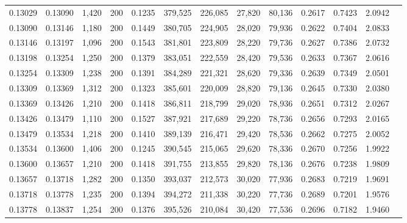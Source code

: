 \begin{tabular}{rrrrrrrrrrrrr}
0.13029 & 0.13090 &  1,420 & 200 &                                     0.1235 & 379,525 & 226,085 &  27,820 &  80,136 & 0.2617 & 0.7423 & 2.0942 \\
0.13090 & 0.13146 &  1,180 & 200 &                                     0.1449 & 380,705 & 224,905 &  28,020 &  79,936 & 0.2622 & 0.7404 & 2.0833 \\
0.13146 & 0.13197 &  1,096 & 200 &                                     0.1543 & 381,801 & 223,809 &  28,220 &  79,736 & 0.2627 & 0.7386 & 2.0732 \\
0.13198 & 0.13254 &  1,250 & 200 &                                     0.1379 & 383,051 & 222,559 &  28,420 &  79,536 & 0.2633 & 0.7367 & 2.0616 \\
0.13254 & 0.13309 &  1,238 & 200 &                                     0.1391 & 384,289 & 221,321 &  28,620 &  79,336 & 0.2639 & 0.7349 & 2.0501 \\
0.13309 & 0.13369 &  1,312 & 200 &                                     0.1323 & 385,601 & 220,009 &  28,820 &  79,136 & 0.2645 & 0.7330 & 2.0380 \\
0.13369 & 0.13426 &  1,210 & 200 &                                     0.1418 & 386,811 & 218,799 &  29,020 &  78,936 & 0.2651 & 0.7312 & 2.0267 \\
0.13426 & 0.13479 &  1,110 & 200 &                                     0.1527 & 387,921 & 217,689 &  29,220 &  78,736 & 0.2656 & 0.7293 & 2.0165 \\
0.13479 & 0.13534 &  1,218 & 200 &                                     0.1410 & 389,139 & 216,471 &  29,420 &  78,536 & 0.2662 & 0.7275 & 2.0052 \\
0.13534 & 0.13600 &  1,406 & 200 &                                     0.1245 & 390,545 & 215,065 &  29,620 &  78,336 & 0.2670 & 0.7256 & 1.9922 \\
0.13600 & 0.13657 &  1,210 & 200 &                                     0.1418 & 391,755 & 213,855 &  29,820 &  78,136 & 0.2676 & 0.7238 & 1.9809 \\
0.13657 & 0.13718 &  1,282 & 200 &                                     0.1350 & 393,037 & 212,573 &  30,020 &  77,936 & 0.2683 & 0.7219 & 1.9691 \\
0.13718 & 0.13778 &  1,235 & 200 &                                     0.1394 & 394,272 & 211,338 &  30,220 &  77,736 & 0.2689 & 0.7201 & 1.9576 \\
0.13778 & 0.13837 &  1,254 & 200 &                                     0.1376 & 395,526 & 210,084 &  30,420 &  77,536 & 0.2696 & 0.7182 & 1.9460 \\

\end{tabular}

